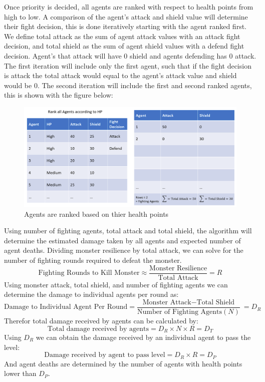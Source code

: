 Once priority is decided, all agents are ranked with respect to health points from high to low. A comparison of the agent's attack and shield value will determine their fight decision, this is done iteratively starting with the agent ranked first. We define total attack as the sum of agent attack values with an attack fight decision, and total shield as the sum of agent shield values with a defend fight decision. Agent's that attack will have 0 shield and agents defending has 0 attack. The first iteration will include only the first agent, such that if the fight decision is attack the total attack would equal to the agent's attack value and shield would be 0. The second iteration will include the first and second ranked agents, this is shown with the figure below:

\begin{figure}[htb]
    \centering
    \includegraphics[width=1\textwidth]{008_team_5_agent_design/images/Rank-all-Agents-by-hp.png}
    \caption{Agents are ranked based on thier health points}
    \label{rankagents}
\end{figure}


Using number of fighting agents, total attack and total shield, the algorithm will determine the estimated damage taken by all agents and expected number of agent deaths. Dividing monster resilience by total attack, we can solve for the number of fighting rounds required to defeat the monster.
\[\text{Fighting Rounds to Kill Monster} \approx \frac{\text{Monster Resilience}}{\text{Total Attack}}=R\]
Using monster attack, total shield, and number of fighting agents we can determine the damage to individual agents per round as:
\[\text{Damage to Individual Agent Per Round} = \frac{\text{Monster Attack}\mathrm{-}\text{Total Shield}}{\text{Number of Fighting Agents} (N)}\ =D_R\]
Therefor total damage received by agents can be calculated by:
\[\text{Total damage received by agents} = D_R \times N \times R = D_T\]
Using $D_R$ we can obtain the damage received by an individual agent to pass the level:
\[\text{Damage received by agent to pass level} = D_R \times  R = D_P\]
And agent deaths are determined by the number of agents with health points lower than $D_P$.

